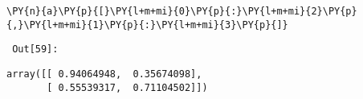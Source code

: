 {\par%
\vspace{-1\baselineskip}%
}%
\begin{notebookcell}[59]%
\begin{addmargin}[\cellleftmargin]{0em}%
{\smaller%
\par%
%
\vspace{-1\smallerfontscale}%
\begin{Verbatim}[commandchars=\\\{\}]
\PY{n}{a}\PY{p}{[}\PY{l+m+mi}{0}\PY{p}{:}\PY{l+m+mi}{2}\PY{p}{,}\PY{l+m+mi}{1}\PY{p}{:}\PY{l+m+mi}{3}\PY{p}{]}
\end{Verbatim}
%
\par%
\vspace{-1\smallerfontscale}}%
\end{addmargin}
\end{notebookcell}

\par\vspace{1\smallerfontscale}%
    
        {\par%
        \vspace{-1\smallerfontscale}%
        \noindent%
        \begin{minipage}{\cellleftmargin}%
    \hfill%
    {\smaller%
    \tt%
    \color{nbframe-out-prompt}%
    Out[59]:}%
    \hspace{\inputpadding}%
    \hspace{0em}%
    \hspace{3pt}%
    \end{minipage}%
        }%
    \begin{addmargin}[\cellleftmargin]{0em}%
    {\smaller%
    \vspace{-1\smallerfontscale}%
    
    
    
    \begin{verbatim}
array([[ 0.94064948,  0.35674098],
       [ 0.55539317,  0.71104502]])
    \end{verbatim}

    
}%
    \end{addmargin}%

